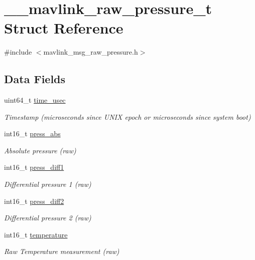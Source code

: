 \hypertarget{struct____mavlink__raw__pressure__t}{\section{\+\_\+\+\_\+mavlink\+\_\+raw\+\_\+pressure\+\_\+t Struct Reference}
\label{struct____mavlink__raw__pressure__t}
}


{\ttfamily \#include $<$mavlink\+\_\+msg\+\_\+raw\+\_\+pressure.\+h$>$}

\subsection*{Data Fields}
\begin{DoxyCompactItemize}
\item 
uint64\+\_\+t \hyperlink{struct____mavlink__raw__pressure__t_a659746eb22bad8e9e29aac0efcba19d2}{time\+\_\+usec}
\begin{DoxyCompactList}\small\item\em Timestamp (microseconds since U\+N\+I\+X epoch or microseconds since system boot) \end{DoxyCompactList}\item 
int16\+\_\+t \hyperlink{struct____mavlink__raw__pressure__t_aab16fd5b27c766d69df4ffa252d573e3}{press\+\_\+abs}
\begin{DoxyCompactList}\small\item\em Absolute pressure (raw) \end{DoxyCompactList}\item 
int16\+\_\+t \hyperlink{struct____mavlink__raw__pressure__t_ae53766b9335fa7900b3a72daca467b70}{press\+\_\+diff1}
\begin{DoxyCompactList}\small\item\em Differential pressure 1 (raw) \end{DoxyCompactList}\item 
int16\+\_\+t \hyperlink{struct____mavlink__raw__pressure__t_a7b832c03aaa2a3f55e309d590d9fc93b}{press\+\_\+diff2}
\begin{DoxyCompactList}\small\item\em Differential pressure 2 (raw) \end{DoxyCompactList}\item 
int16\+\_\+t \hyperlink{struct____mavlink__raw__pressure__t_a7d57fd80130f0588285f03669bf8c016}{temperature}
\begin{DoxyCompactList}\small\item\em Raw Temperature measurement (raw) \end{DoxyCompactList}\end{DoxyCompactItemize}


